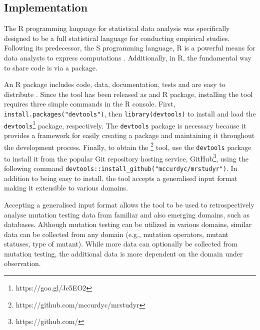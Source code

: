 \subsection{Implementation}

The R programming language for statistical data analysis was specifically designed to
be a full statistical language for conducting empirical studies. Following its predecessor, the S programming
language, R is a powerful means for data analysts to express computations \cite{ihaka1996r}.
Additionally, in R, the fundamental way to share code is via a package.

An R package includes code, data, documentation, tests and are easy to distribute \cite{wickham2015r}.
Since the \mr tool has been released as and R package, installing the tool requires three simple
commands in the R console. First, \texttt{install.packages("devtools")}, then \texttt{library(devtools)}
to install and load the \texttt{devtools}\footnote{https://goo.gl/Je5EO2} package, respectively.
The \texttt{devtools} package is necessary because it provides a framework for easily creating a package
and maintaining it throughout the development process. Finally, to obtain the
\mr\footnote{https://github.com/mccurdyc/mrstudyr} tool, use the \texttt{devtools} package to install it
from the popular Git repository hosting service, GitHub\footnote{https://github.com/},
using the following command \texttt{devtools::install\_github("mccurdyc/mrstudyr")}. In addition
to being easy to install, the \mr tool accepts a generalised input format making
it extensible to various domains.

Accepting a generalised input format allows the \mr tool to be used to retrospectively analyse mutation testing
data from familiar and also emerging domains, such as databases. Although mutation
testing can be utilized in various domains, similar data can be collected from any
domain (e.g., mutation operators, mutant statuses, type of mutant). While more data
can optionally be collected from mutation testing, the additional data is more
dependent on the domain under observation.
